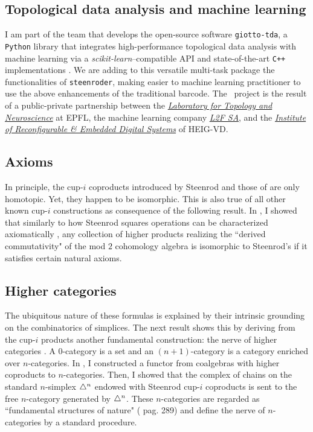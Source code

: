 \subsection{Topological data analysis and machine learning} \label{ss:giotto}

I am part of the team that develops the open-source software \texttt{giotto-tda}, a \texttt{Python} library that integrates high-performance topological data analysis with machine learning via a \emph{scikit-learn}--compatible API and state-of-the-art \texttt{C++} implementations \cite{medina2021giotto}.
We are adding to this versatile multi-task package the functionalities of \texttt{steenroder}, making easier to machine learning practitioner to use the above enhancements of the traditional barcode.
The \giottoTDA\ project is the result of a public-private partnership between the \href{https://www.epfl.ch/labs/hessbellwald-lab/}{\textit{Laboratory for Topology and Neuroscience}} at EPFL, the machine learning company \href{https://www.l2f.ch/}{\textit{L2F SA}}, and the \href{https://heig-vd.ch/en/research/reds}{\textit{Institute of Reconfigurable \& Embedded Digital Systems}} of HEIG-VD.

\subsection{Axioms}

In principle, the cup-$i$ coproducts introduced by Steenrod \cite{steenrod1947products} and those of \cite{medina2021newformulas} are only homotopic.
Yet, they happen to be isomorphic.
This is also true of all other known cup-$i$ constructions \cite{gonzalez-diaz1999steenrod, mcclure2003multivariable, berger2004combinatorial, medina2020prop1} as consequence of the following result.
In \cite{medina2018axiomatic}, I showed that similarly to how Steenrod squares operations can be characterized axiomatically \cite{steenrod1962cohomology}, any collection of higher products realizing the ``derived commutativity" of the mod $2$ cohomology algebra is isomorphic to Steenrod's if it satisfies certain natural axioms.

\subsection{Higher categories}

The ubiquitous nature of these formulas is explained by their intrinsic grounding on the combinatorics of simplices.
The next result shows this by deriving from the cup-$i$ products another fundamental construction: the nerve of higher categories \cite{street1987orientals}.
A $0$-category is a set and an $(n+1)$-category is a category enriched over $n$-categories.
In \cite{medina2020globular}, I constructed a functor from coalgebras with higher coproducts to $n$-categories.
Then, I showed that the complex of chains on the standard $n$-simplex $\triangle^n$ endowed with Steenrod cup-$i$ coproducts is sent to the free $n$-category generated by $\triangle^n$.
These $n$-categories are regarded as ``fundamental structures of nature" (\cite{street1987orientals} pag. 289) and define the nerve of $n$-categories by a standard procedure.

